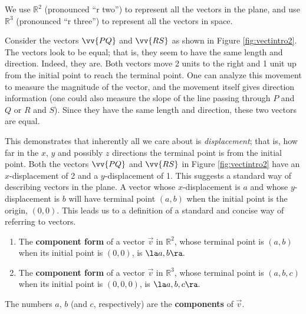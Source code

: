 
We use $\mathbb{R}^2$ (pronounced ``r two'') to represent all the vectors in the plane, and use $\mathbb{R}^3$ (pronounced ``r three'') to represent all the vectors in space.

Consider the vectors $\vv{PQ}$ and $\vv{RS}$ as shown in Figure \ref{fig:vectintro2}. The vectors look to be equal; that is, they seem to have the same length and direction. Indeed, they are. Both vectors move 2 units to the right and 1 unit up from the initial point to reach the terminal point. One can analyze this movement to measure the magnitude of the vector, and the movement itself gives direction information (one could also measure the slope of the line passing through $P$ and $Q$ or $R$ and $S$). Since they have the same length and direction, these two vectors are equal.

This demonstrates that inherently all we care about is \textit{displacement}; that is, how far in the $x$, $y$ and possibly $z$ directions the terminal point is from the initial point. Both the vectors $\vv{PQ}$ and $\vv{RS}$ in Figure \ref{fig:vectintro2} have an $x$-displacement of 2 and a $y$-displacement of 1. This suggests a standard way of describing vectors in the plane. A vector whose $x$-displacement is $a$ and whose $y$-displacement is $b$ will have terminal point $(a,b)$ when the initial point is the origin, $(0,0)$. This leads us to a definition of a standard and concise way of referring to vectors.

{\begin{enumerate}
	\item The \textbf{component form} of a vector $\vec{v}$ in $\mathbb{R}^2$, whose terminal point is $(a,b)$ when its initial point is $(0,0)$, is $\la a,b\ra.$ 
	
	\item	The \textbf{component form} of a vector $\vec{v}$ in $\mathbb{R}^3$, whose terminal point is $(a,b,c)$ when its initial point is $(0,0,0)$, is $\la a,b,c\ra.$ 
	
\end{enumerate}
The numbers $a$, $b$ (and $c$, respectively) are the \textbf{components} of $\vec v$.
}


